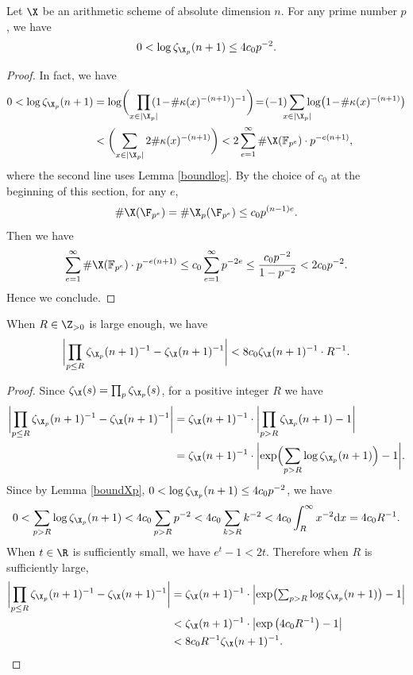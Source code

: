 \begin{lem}\label{boundXp}
Let $\X$ be an arithmetic scheme of absolute dimension $n$. For any prime number $p$, we have
\[
0<\log\zeta_{\X_p}(n+1)\leq 4c_0p^{-2}.
\]
\end{lem}
\begin{proof}
In fact, we have
\begin{align*}
0<\log\zeta_{\X_p}(n+1) &=\log \biggl(\prod_{x\in |\X_p|}\hspace*{-2mm}(1\!-\!\#\kappa(x)^{-(n+1)})^{-1} \biggr) \!=\!(-1) \hspace*{-2mm}\sum_{x\in |\X_p|} \hspace*{-2mm}\log \bigl(1\!-\!\#\kappa(x)^{-(n+1)} \bigr) \\
&<\biggl(\sum_{x\in |\X_p|} 2\#\kappa(x)^{-(n+1)} \biggr) < 2\sum_{e=1}^{\infty}\#\X(\mathbb{F}_{p^e})\cdot p^{-e(n+1)},
\end{align*}
where the second line uses Lemma \ref{boundlog}.
By the choice of $c_0$ at the beginning of this section, for any $e$,
\[
\#\X(\F_{p^e})=\#\X_{p}(\F_{p^e})\leq c_0p^{(n-1)e}.
\]
Then we have
\[
\sum_{e=1}^{\infty}\#\X(\mathbb{F}_{p^e})\cdot p^{-e(n+1)} \leq c_0\sum_{e=1}^{\infty} p^{-2e}\leq \frac{c_0p^{-2}}{1-p^{-2}}<2c_0p^{-2}.
\]
Hence we conclude.
\end{proof}

\begin{lem}\label{zetaintegral}
When $R\in \Z_{>0}$ is large enough, we have
\[
\biggl | \prod_{p\leq R}\zeta_{\X_p}(n+1)^{-1}-\zeta_\X(n+1)^{-1} \biggr| < 8c_0 \zeta_\X(n+1)^{-1}\cdot R^{-1}.
\]
\end{lem}
\begin{proof}
Since $\zeta_{\X}(s)=\prod_p\zeta_{\X_p}(s)$, for a positive integer $R$ we have
\begin{align*}
\biggl | \prod_{p\leq R}\zeta_{\X_p}(n+1)^{-1}-\zeta_\X(n+1)^{-1} \biggr|& = \zeta_\X(n+1)^{-1}\cdot \biggl| \prod_{p>R}\zeta_{\X_p}(n+1)-1 \biggr|\\
&= \zeta_\X(n+1)^{-1}\cdot \biggl| \exp\Bigl(\sum_{p>R}\log\zeta_{\X_p}(n+1)\Bigr)-1 \biggr|.
\end{align*}
Since by Lemma \ref{boundXp}, $0<\log\zeta_{\X_p}(n+1)\leq 4c_0p^{-2}$, we have
\[
0<\sum_{p>R}\log\zeta_{\X_p}(n+1) < 4c_0\sum_{p>R}p^{-2}<4c_0\sum_{k>R}k^{-2}< 4c_0\int_{R}^{\infty}x^{-2}\mathrm{d}x= 4c_0 R^{-1}.
\]
When $t\in \R$ is sufficiently small, we have $e^t-1<2t$. Therefore when $R$ is sufficiently large,
\begin{align*}
\biggl| \prod_{p\leq R}\zeta_{\X_p}(n+1)^{-1}-\zeta_\X(n+1)^{-1} \biggr| &= \zeta_\X(n+1)^{-1}\cdot \Bigl| \exp\bigl(\textstyle\sum_{p>R}\log\zeta_{\X_p}(n+1)\bigr)-1 \Bigr|\\
&< \zeta_\X(n+1)^{-1}\cdot \left| \exp\left(4c_0 R^{-1}\right)-1 \right|\\
&<8c_0R^{-1}\zeta_\X(n+1)^{-1}.\qedhere
\end{align*}
\end{proof}

